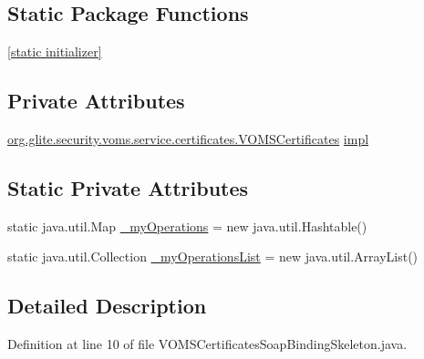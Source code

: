 \subsection*{Static Package Functions}
\begin{DoxyCompactItemize}
\item 
\hyperlink{classorg_1_1glite_1_1security_1_1voms_1_1service_1_1certificates_1_1VOMSCertificatesSoapBindingSkeleton_a2e019a96bf1d9b68c92833fd0c294204}{\mbox{[}static initializer\mbox{]}}
\end{DoxyCompactItemize}
\subsection*{Private Attributes}
\begin{DoxyCompactItemize}
\item 
\hyperlink{interfaceorg_1_1glite_1_1security_1_1voms_1_1service_1_1certificates_1_1VOMSCertificates}{org.glite.security.voms.service.certificates.VOMSCertificates} \hyperlink{classorg_1_1glite_1_1security_1_1voms_1_1service_1_1certificates_1_1VOMSCertificatesSoapBindingSkeleton_a2d621dce09a90972e8409a0dc9936638}{impl}
\end{DoxyCompactItemize}
\subsection*{Static Private Attributes}
\begin{DoxyCompactItemize}
\item 
static java.util.Map \hyperlink{classorg_1_1glite_1_1security_1_1voms_1_1service_1_1certificates_1_1VOMSCertificatesSoapBindingSkeleton_af84bddc4a9a5ffc869b7b4b7083b2baa}{\_\-myOperations} = new java.util.Hashtable()
\item 
static java.util.Collection \hyperlink{classorg_1_1glite_1_1security_1_1voms_1_1service_1_1certificates_1_1VOMSCertificatesSoapBindingSkeleton_ae9461020ed1f45e7dafed3a3f830f283}{\_\-myOperationsList} = new java.util.ArrayList()
\end{DoxyCompactItemize}


\subsection{Detailed Description}


Definition at line 10 of file VOMSCertificatesSoapBindingSkeleton.java.



